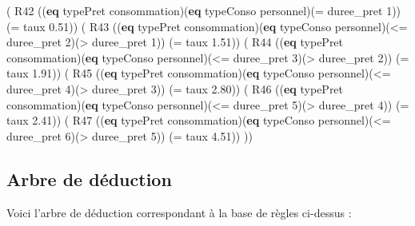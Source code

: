 \documentclass[
]{article}
\newenvironment{Shaded}{}{}
\newcommand{\DecValTok}[1]{\textcolor[rgb]{0.25,0.63,0.44}{#1}}
\newcommand{\FloatTok}[1]{\textcolor[rgb]{0.25,0.63,0.44}{#1}}
\newcommand{\KeywordTok}[1]{\textcolor[rgb]{0.00,0.44,0.13}{\textbf{#1}}}
\newcommand{\NormalTok}[1]{#1}
\newcommand{\OperatorTok}[1]{\textcolor[rgb]{0.40,0.40,0.40}{#1}}
\begin{document}
\begin{Shaded}
\begin{Highlighting}[]
\NormalTok{( R42 ((}\KeywordTok{eq}\NormalTok{ typePret consommation)(}\KeywordTok{eq}\NormalTok{ typeConso personnel)(}\OperatorTok{=}\NormalTok{ duree\_pret }\DecValTok{1}\NormalTok{)) (}\OperatorTok{=}\NormalTok{ taux }\FloatTok{0.51}\NormalTok{))}
\NormalTok{( R43 ((}\KeywordTok{eq}\NormalTok{ typePret consommation)(}\KeywordTok{eq}\NormalTok{ typeConso personnel)(}\OperatorTok{\textless{}=}\NormalTok{ duree\_pret }\DecValTok{2}\NormalTok{)(}\OperatorTok{\textgreater{}}\NormalTok{ duree\_pret }\DecValTok{1}\NormalTok{)) }
\NormalTok{    (}\OperatorTok{=}\NormalTok{ taux }\FloatTok{1.51}\NormalTok{))}
\NormalTok{( R44 ((}\KeywordTok{eq}\NormalTok{ typePret consommation)(}\KeywordTok{eq}\NormalTok{ typeConso personnel)(}\OperatorTok{\textless{}=}\NormalTok{ duree\_pret }\DecValTok{3}\NormalTok{)(}\OperatorTok{\textgreater{}}\NormalTok{ duree\_pret }\DecValTok{2}\NormalTok{)) }
\NormalTok{    (}\OperatorTok{=}\NormalTok{ taux }\FloatTok{1.91}\NormalTok{))}
\NormalTok{( R45 ((}\KeywordTok{eq}\NormalTok{ typePret consommation)(}\KeywordTok{eq}\NormalTok{ typeConso personnel)(}\OperatorTok{\textless{}=}\NormalTok{ duree\_pret }\DecValTok{4}\NormalTok{)(}\OperatorTok{\textgreater{}}\NormalTok{ duree\_pret }\DecValTok{3}\NormalTok{)) }
\NormalTok{    (}\OperatorTok{=}\NormalTok{ taux }\FloatTok{2.80}\NormalTok{))}
\NormalTok{( R46 ((}\KeywordTok{eq}\NormalTok{ typePret consommation)(}\KeywordTok{eq}\NormalTok{ typeConso personnel)(}\OperatorTok{\textless{}=}\NormalTok{ duree\_pret }\DecValTok{5}\NormalTok{)(}\OperatorTok{\textgreater{}}\NormalTok{ duree\_pret }\DecValTok{4}\NormalTok{)) }
\NormalTok{    (}\OperatorTok{=}\NormalTok{ taux }\FloatTok{2.41}\NormalTok{))}
\NormalTok{( R47 ((}\KeywordTok{eq}\NormalTok{ typePret consommation)(}\KeywordTok{eq}\NormalTok{ typeConso personnel)(}\OperatorTok{\textless{}=}\NormalTok{ duree\_pret }\DecValTok{6}\NormalTok{)(}\OperatorTok{\textgreater{}}\NormalTok{ duree\_pret }\DecValTok{5}\NormalTok{)) }
\NormalTok{    (}\OperatorTok{=}\NormalTok{ taux }\FloatTok{4.51}\NormalTok{))}
\NormalTok{))}
\end{Highlighting}
\end{Shaded}

\hypertarget{arbre-de-duxe9duction}{%
\subsection{Arbre de déduction}\label{arbre-de-duxe9duction}}

Voici l'arbre de déduction correspondant à la base de règles ci-dessus :
\end{document}
